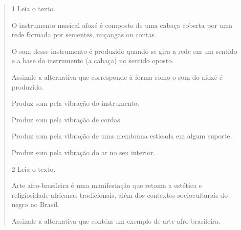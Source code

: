 \begin{escolha}
\begin{quote}
\num{1}  Leia o texto.

O instrumento musical afoxé é composto de uma cabaça coberta por uma
rede formada por sementes, miçangas ou contas.


O som desse instrumento é
produzido quando se gira a rede em um sentido e a base do instrumento (a
cabaça) no sentido oposto.

Assinale a alternativa que corresponde à forma como o som do afoxé é
produzido.

\begin{escolha}
\item
  Produz som pela vibração do instrumento.
\item
  Produz som pela vibração de cordas.
\item
  Produz som pela vibração de uma membrana esticada em algum suporte.
\item
  Produz som pela vibração do ar no seu interior.
\end{escolha}


\num{2}  Leia o texto.

Arte afro-brasileira é uma manifestação que retoma a estética e religiosidade africanas tradicionais, além dos contextos socioculturais do negro no Brasil.

Assinale a alternativa que contém um exemplo de arte afro-brasileira.


\end{quote}
\end{escolha}
